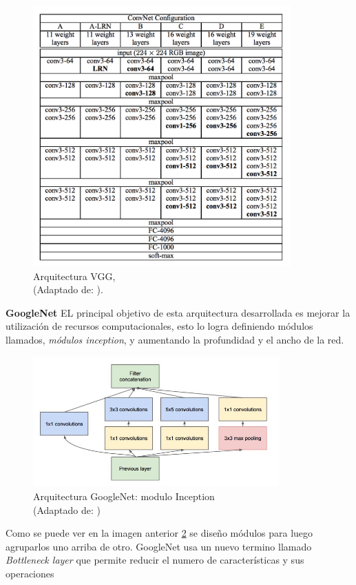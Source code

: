 \begin{figure}[H]
 \centering
  \includegraphics[height=10cm,keepaspectratio=true,clip=true]{imagenes/MarcoTeorico/vgg.png}
  \caption{Arquitectura VGG,\\ (Adaptado de: \citep{vgg}).}
	\label{Fig:vgg}
\end{figure}

\par \textbf{GoogleNet} \citep{googlenet} EL principal objetivo de esta arquitectura desarrollada es mejorar la utilización de recursos computacionales, esto lo logra definiendo módulos llamados, \textit{módulos inception}, y aumentando la profundidad y el ancho de la red. 
\begin{figure}[H]
 \centering
  \includegraphics[height=5cm,keepaspectratio=true,clip=true]{imagenes/MarcoTeorico/inception-1.jpg}
  \caption{Arquitectura GoogleNet: modulo Inception \\ (Adaptado de: \citep{googlenet})}
	\label{Fig:inception}
\end{figure}
Como se puede ver en la imagen anterior \ref{Fig:inception} se diseño módulos para luego agruparlos uno arriba de otro. GoogleNet usa un nuevo termino llamado \textit{Bottleneck layer} que permite reducir el numero de características y sus operaciones 

